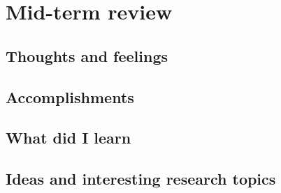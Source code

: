 
\section*{\textbf{Mid-term review}}
\subsection*{Thoughts and feelings}
\subsection*{Accomplishments}
\subsection*{What did I learn}
\subsection*{Ideas and interesting research topics}
